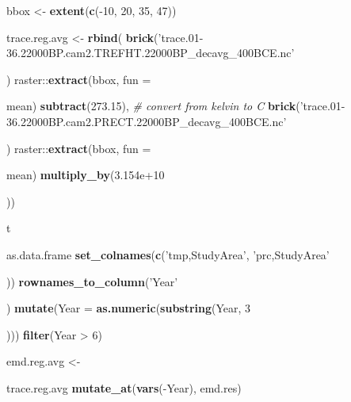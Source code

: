 \documentclass[11pt,]{tufte-handout}
\newenvironment{Shaded}{}{}
\newcommand{\KeywordTok}[1]{\textcolor[rgb]{0.00,0.44,0.13}{\textbf{{#1}}}}
\newcommand{\DataTypeTok}[1]{\textcolor[rgb]{0.56,0.13,0.00}{{#1}}}
\newcommand{\DecValTok}[1]{\textcolor[rgb]{0.25,0.63,0.44}{{#1}}}
\newcommand{\FloatTok}[1]{\textcolor[rgb]{0.25,0.63,0.44}{{#1}}}
\newcommand{\StringTok}[1]{\textcolor[rgb]{0.25,0.44,0.63}{{#1}}}
\newcommand{\CommentTok}[1]{\textcolor[rgb]{0.38,0.63,0.69}{\textit{{#1}}}}
\newcommand{\NormalTok}[1]{{#1}}
\begin{document}
\begin{Shaded}
\begin{Highlighting}[]
\NormalTok{bbox <-}\StringTok{ }\KeywordTok{extent}\NormalTok{(}\KeywordTok{c}\NormalTok{(-}\DecValTok{10}\NormalTok{, }\DecValTok{20}\NormalTok{, }\DecValTok{35}\NormalTok{, }\DecValTok{47}\NormalTok{))}

\NormalTok{trace.reg.avg <-}\StringTok{ }\KeywordTok{rbind}\NormalTok{(}
  \KeywordTok{brick}\NormalTok{(}\StringTok{'trace.01-36.22000BP.cam2.TREFHT.22000BP_decavg_400BCE.nc'}\NormalTok{) %
\StringTok{    }\NormalTok{raster::}\KeywordTok{extract}\NormalTok{(bbox, }\DataTypeTok{fun =} \NormalTok{mean) %
\StringTok{    }\KeywordTok{subtract}\NormalTok{(}\FloatTok{273.15}\NormalTok{), }\CommentTok{# convert from kelvin to C}
  \KeywordTok{brick}\NormalTok{(}\StringTok{'trace.01-36.22000BP.cam2.PRECT.22000BP_decavg_400BCE.nc'}\NormalTok{) %
\StringTok{    }\NormalTok{raster::}\KeywordTok{extract}\NormalTok{(bbox, }\DataTypeTok{fun =} \NormalTok{mean) %
\StringTok{    }\KeywordTok{multiply_by}\NormalTok{(}\FloatTok{3.154e+10}\NormalTok{)) %
\StringTok{  }\NormalTok{t %
\StringTok{  }\NormalTok{as.data.frame %
\StringTok{  }\KeywordTok{set_colnames}\NormalTok{(}\KeywordTok{c}\NormalTok{(}\StringTok{'tmp,StudyArea'}\NormalTok{, }\StringTok{'prc,StudyArea'}\NormalTok{)) %
\StringTok{  }\KeywordTok{rownames_to_column}\NormalTok{(}\StringTok{'Year'}\NormalTok{) %
\StringTok{  }\KeywordTok{mutate}\NormalTok{(}\DataTypeTok{Year =} \KeywordTok{as.numeric}\NormalTok{(}\KeywordTok{substring}\NormalTok{(Year, }\DecValTok{3}\NormalTok{))) %
\StringTok{  }\KeywordTok{filter}\NormalTok{(Year >}\StringTok{ }\DecValTok{6}\NormalTok{) }

\NormalTok{emd.reg.avg <-}\StringTok{ }\NormalTok{trace.reg.avg %
\StringTok{  }\KeywordTok{mutate_at}\NormalTok{(}\KeywordTok{vars}\NormalTok{(-Year), emd.res)}

}}}}}}}}}}}
\end{Highlighting}
\end{Shaded}
\end{document}
